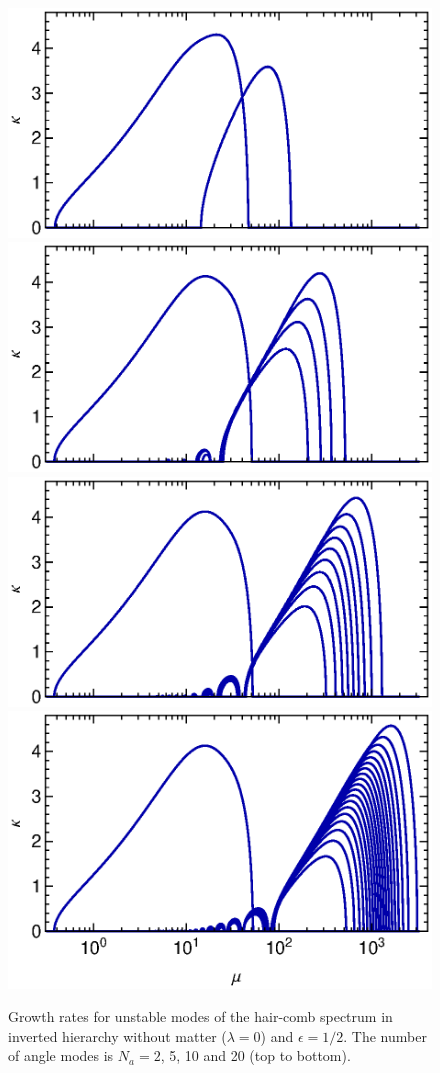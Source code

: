 \documentclass[twocolumn,prd,showpacs,
floatfix,preprintnumbers,nofootinbib]{revtex4}
\begin{document}
\begin{figure}
\includegraphics[width=0.8\columnwidth]{discrete1a.eps}
\vskip6pt
\includegraphics[width=0.8\columnwidth]{discrete1b.eps}
\vskip6pt
\includegraphics[width=0.8\columnwidth]{discrete1c.eps}
\vskip6pt
\includegraphics[width=0.8\columnwidth]{discrete1d.eps}
\caption{Growth rates for unstable modes of the hair-comb
spectrum in inverted hierarchy without matter ($\lambda=0$) and $\epsilon=1/2$.
The number of angle modes is
$N_a=2$, 5, 10 and 20 (top to bottom).
\label{fig:discrete1}}
\end{figure}
\end{document}
